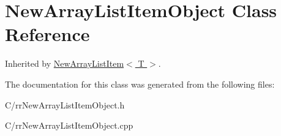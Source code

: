 \hypertarget{classrrc_1_1_new_array_list_item_object}{\section{New\-Array\-List\-Item\-Object Class Reference}
\label{classrrc_1_1_new_array_list_item_object}
}


Inherited by \hyperlink{classrrc_1_1_new_array_list_item}{New\-Array\-List\-Item$<$ T $>$}.



The documentation for this class was generated from the following files\-:\begin{DoxyCompactItemize}
\item 
C/rr\-New\-Array\-List\-Item\-Object.\-h\item 
C/rr\-New\-Array\-List\-Item\-Object.\-cpp\end{DoxyCompactItemize}
